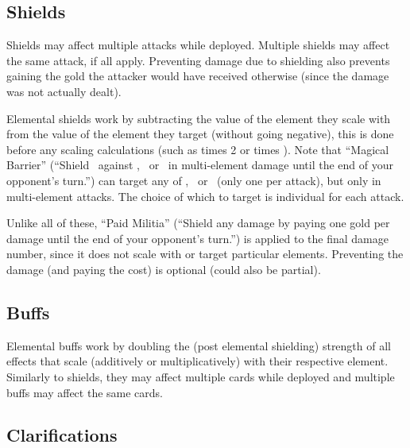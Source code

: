 \documentclass[dvipsnames,parskip,a4paper]{scrartcl}
\newcommand{\iconsize}{3.4mm}
\newcommand{\icondepth}{0.45mm}
\newcommand{\icon}[1]{\raisebox{-\icondepth}{\texttt{[image:  \#1 ]}}}
\newcommand{\fire}{\icon{icons/fire.png}}
\newcommand{\earth}{\icon{icons/earth.png}}
\newcommand{\water}{\icon{icons/water.png}}
\newcommand{\magic}{\icon{icons/magic.png}}
\begin{document}
\subsection*{Shields}

Shields may affect multiple attacks while deployed. Multiple shields may affect the same attack, if all apply. Preventing damage due to shielding also prevents gaining the gold the attacker would have received otherwise (since the damage was not actually dealt).

Elemental shields work by subtracting the value of the element they scale with from the value of the element they target (without going negative), this is done before any scaling calculations (such as times 2 or times \magic). Note that ``Magical Barrier'' (``Shield \magic \ against \fire, \earth \ or \water \ in multi-element damage until the end of your opponent's turn.'') can target any of \fire, \earth \ or \water \ (only one per attack), but only in multi-element attacks. The choice of which to target is individual for each attack.

Unlike all of these, ``Paid Militia'' (``Shield any damage by paying one gold per damage until the end of your opponent's turn.'') is applied to the final damage number, since it does not scale with or target particular elements. Preventing the damage (and paying the cost) is optional (could also be partial).

\subsection*{Buffs}

Elemental buffs work by doubling the (post elemental shielding) strength of all effects that scale (additively or multiplicatively) with their respective element. Similarly to shields, they may affect multiple cards while deployed and multiple buffs may affect the same cards.

\subsection*{Clarifications}
\end{document}
